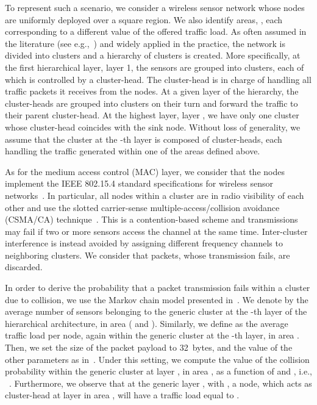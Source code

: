 \documentclass[11pt, draftcls, onecolumn, a4paper]{IEEEtran}
\begin{document}
To represent such a scenario,  we consider a wireless sensor network 
whose nodes are uniformly deployed over a square region. 
We also identify  areas,  ,
each corresponding to a different value of the offered traffic load.
As often assumed in the literature (see e.g.,~\cite{cluster,clusterH})
and widely applied in the practice, 
the network is divided into clusters
and a hierarchy of clusters is created. 
More specifically, at the first hierarchical layer, layer 1, the sensors 
are grouped into clusters, each of which is 
controlled by a cluster-head. 
The cluster-head is in charge of handling all traffic 
packets it receives from the nodes.
At a given layer  of the hierarchy, 
the cluster-heads are grouped into clusters on their turn and 
forward the traffic to their parent cluster-head.
At the highest layer, layer , we have only one cluster whose 
cluster-head coincides with the sink node.
Without loss of generality, we assume that the cluster at the -th layer 
is composed of  cluster-heads, each handling the traffic 
generated within one of the  areas defined above.

As for the medium access control (MAC) layer, we consider that the nodes
implement the IEEE 802.15.4 standard 
specifications for wireless sensor networks~\cite{802.15.4}. 
In particular, all nodes  within a cluster are in radio visibility 
of each other and use the  slotted
carrier-sense multiple-access/collision avoidance  
 (CSMA/CA) technique~\cite{802.15.4}. This is a contention-based scheme 
and transmissions may fail if two or more sensors
access the channel at the same time. Inter-cluster interference 
is instead avoided by assigning  different frequency 
channels to neighboring clusters. 
We consider that packets, whose transmission fails, are discarded.

In order to derive the probability that a packet transmission fails within
a cluster due
to collision, we use the Markov chain  model presented in~\cite{collision}.
We denote by  the average number of sensors belonging to the generic
cluster at the -th layer of the hierarchical architecture, in area 
( and ). 
Similarly, we define  as the average traffic load per node, 
again within the generic cluster at the -th layer, in area . 
Then, we set the size of the packet payload to 32~bytes, 
and  the value of the other parameters as in~\cite{collision}. 
Under this setting, 
we compute the value of the collision probability within
the generic cluster at layer , in area , 
as a function of  and  , i.e., 
~\cite{collision}. 
Furthermore, we observe that at the generic layer , with , 
a node, which acts as cluster-head  at layer  in area , will
have a traffic load equal to 
.
\end{document}
